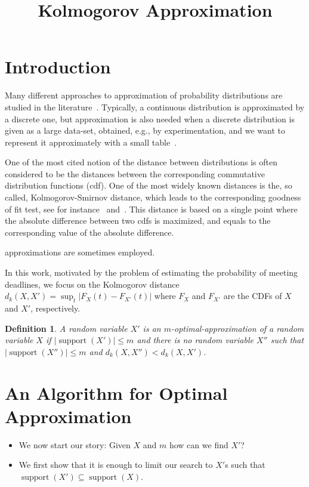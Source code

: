 \documentclass{article}
\title{Kolmogorov Approximation}
\newtheorem{definition}[thm]{Definition}
\DeclareMathOperator{\support}{support}
\begin{document}

\maketitle

\section{Introduction}

Many different approaches to approximation of probability distributions are studied in the literature~\cite{AMCR83,pavlikov2016cvar}. Typically, a continuous distribution is approximated by a discrete one, but approximation is also needed when a discrete distribution is given as a large data-set, obtained, e.g., by experimentation, and we want to represent it approximately with a small table~\cite{PS77}. 

One of the most cited notion of the distance between distributions is often considered to be the distances between the corresponding commutative distribution functions (cdf). One of
the most widely known distances is the, so called, Kolmogorov-Smirnov distance, which leads to the corresponding goodness of fit test, see for instance~\cite{Gibbons and Chakraborti (2011)} and~\cite{Feller (1948)}. This distance is based on a single point where the absolute difference between two cdfs is maximized, and equals to the corresponding value of the absolute difference.


approximations are sometimes employed.

In this work, motivated by the problem of estimating the probability of meeting deadlines, we focus on the Kolmogorov distance $d_k(X,X')= \sup_t |F_X(t) - F_{X'}(t)|$ where $F_X$ and $F_{X'}$ are the CDFs of $X$ and $X'$, respectively.


\begin{definition}
	A random variable $X'$ is an $m$-optimal-approximation of a random variable $X$ if $|\support(X')| \leq m$ and there is no random variable $X''$ such that $|\support(X'')| \leq m$ and $d_k(X,X'') < d_k(X,X')$.
\end{definition}


\section{An Algorithm for Optimal Approximation}


\begin{itemize}
	\item We now start our story: Given $X$ and $m$ how can we find $X'$?
	\item We first show that it is enough to limit our search to $X'$s such that $\support(X') \subseteq \support(X)$.
\end{itemize}
\end{document}
